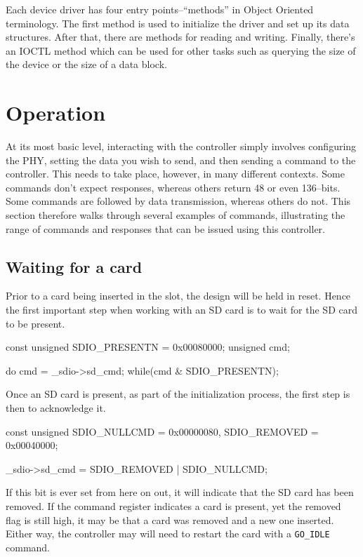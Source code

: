 \documentclass{gqtekspec}
\begin{document}
Each device driver has four entry points--``methods'' in Object Oriented
terminology.  The first method is used to initialize the driver and set up
its data structures.  After that, there are methods for reading and writing.
Finally, there's an IOCTL method which can be used for other tasks such as
querying the size of the device or the size of a data block.

\chapter{Operation}\label{ch:ops}
At its most basic level, interacting with the controller simply involves
configuring the PHY, setting the data you wish to send, and then sending a
command to the controller.  This needs to take place, however, in many
different contexts.  Some commands don't expect responses, whereas others
return 48 or even 136--bits.  Some commands are followed by data transmission,
whereas others do not.  This section therefore walks through several
examples of commands, illustrating the range of commands and responses
that can be issued using this controller.

\section{Waiting for a card}
Prior to a card being inserted in the slot, the design will be held in
reset.  Hence the first important step when working with an SD card is to
wait for the SD card to be present.
\begin{zCpp}
	const	unsigned	SDIO_PRESENTN  = 0x00080000;
	unsigned	cmd;

	do {
		cmd = _sdio->sd_cmd;
	} while(cmd & SDIO_PRESENTN);
\end{zCpp}

Once an SD card is present, as part of the initialization process, the first
step is then to acknowledge it.
\begin{zCpp}
	const	unsigned	SDIO_NULLCMD  = 0x00000080,
				SDIO_REMOVED  = 0x00040000;

	_sdio->sd_cmd = SDIO_REMOVED | SDIO_NULLCMD;
\end{zCpp}

If this bit is ever set from here on out, it will indicate that the SD card
has been removed.  If the command register indicates a card is present, yet
the removed flag is still high, it may be that a card was removed and a
new one inserted.  Either way, the controller may will need to restart the
card with a {\tt GO\_IDLE} command.
\end{document}
